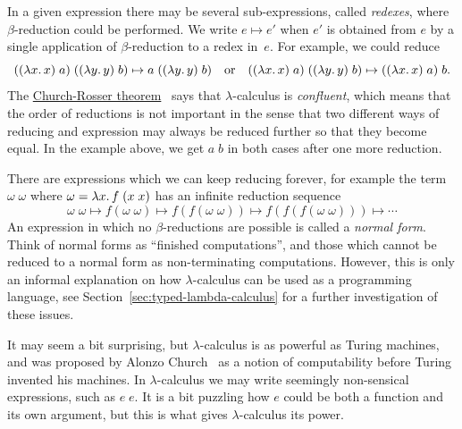In a given expression there may be several sub-expressions, called
\emph{redexes}, where $\beta$-reduction could be performed. We write
$e \mapsto e'$ when $e'$ is obtained from $e$ by a single application
of $\beta$-reduction to a redex in~$e$. For example, we could reduce
%
\begin{equation*}
  ((\lambda x .\,x)\; a)\;((\lambda y .\,y)\;b) \mapsto
  a\; ((\lambda y .\,y)\;b)
  \quad\text{or}\quad
  ((\lambda x .\,x)\; a)\;((\lambda y .\,y)\;b) \mapsto
  ((\lambda x .\,x)\; a)\; b.
\end{equation*}
%
The \href{http://en.wikipedia.org/wiki/Church%E2%80%93Rosser_theorem}{Church-Rosser theorem}~\cite{church36:_some_proper_of_conver} says that
$\lambda$-calculus is \emph{confluent}, which means that the order of
reductions is not important in the sense that two different ways of
reducing and expression may always be reduced further so that they
become equal. In the example above, we get $a\;b$ in both cases after
one more reduction.

There are expressions which we can keep reducing forever, for example
the term $\omega\;\omega$ where $\omega = \lambda x .\,f\;(x\;x)$ has an
infinite reduction sequence
%
\begin{equation*}
  \omega\; \omega \mapsto
  f(\omega\; \omega) \mapsto 
  f(f(\omega\; \omega)) \mapsto 
  f(f(f(\omega\; \omega))) \mapsto
  \cdots
\end{equation*}
%
An expression in which no $\beta$-reductions are possible is called a
\emph{normal form}. Think of normal forms as ``finished
computations'', and those which cannot be reduced to a normal form as
non-terminating computations. However, this is only an informal
explanation on how $\lambda$-calculus can be used as a programming
language, see Section~\ref{sec:typed-lambda-calculus} for a
further investigation of these issues.

It may seem a bit surprising, but $\lambda$-calculus is as powerful as
Turing machines, and was proposed by Alonzo Church~\cite{church32:_set_of_postul_for_found_of_logic} as a
notion of computability before Turing invented his machines. In
$\lambda$-calculus we may write seemingly non-sensical expressions,
such as $e\; e$. It is a bit puzzling how $e$ could be both a function
and its own argument, but this is what gives $\lambda$-calculus its
power.


